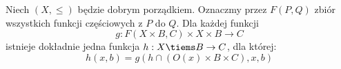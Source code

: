 \begin{theorem}
    Niech \( (X, \leq) \) będzie dobrym porządkiem. Oznaczmy przez \( F(P, Q) \) zbiór wszystkich funkcji częściowych z \( P \) do \( Q \).
    Dla każdej funkcji
    \[
        g : F(X \times B,C) \times X \times B \rightarrow C
    \]
    istnieje dokładnie jedna funkcja \( h : X \tiems B \rightarrow C \), dla której:
    \[
        h(x, b) = g(h \cap (O(x) \times B \times C), x, b)
    \]
\end{theorem}